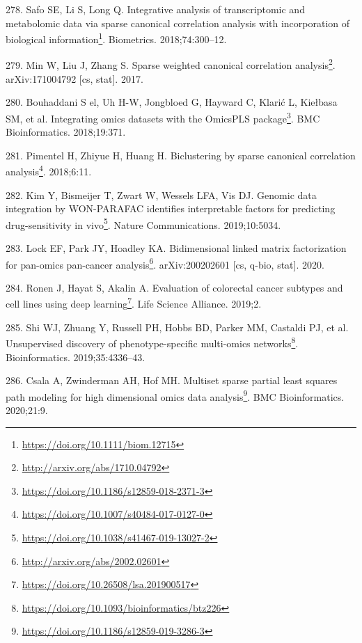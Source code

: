 \documentclass[
  12pt,
  a4paper,
  twoside,
  openright]{book}
\DeclareRobustCommand{\href}[2]{#2\footnote{\url{#1}}}
\newlength{\cslhangindent}
\newlength{\cslentryspacingunit} %
\newenvironment{CSLReferences}[2] %
 {%
  \setlength{\parindent}{0pt}
  \ifodd #1
  \let\oldpar\par
  \def\par{\hangindent=\cslhangindent\oldpar}
  \fi
  \setlength{\parskip}{#2\cslentryspacingunit}
 }%
 {}
\begin{document}
\begin{CSLReferences}{0}{0}
\leavevmode{}%
278. Safo SE, Li S, Long Q. \href{https://doi.org/10.1111/biom.12715}{Integrative analysis of transcriptomic and metabolomic data via sparse canonical correlation analysis with incorporation of biological information}. Biometrics. 2018;74:300--12.

\leavevmode{}%
279. Min W, Liu J, Zhang S. \href{http://arxiv.org/abs/1710.04792}{Sparse weighted canonical correlation analysis}. arXiv:171004792 {[}cs, stat{]}. 2017.

\leavevmode{}%
280. Bouhaddani S el, Uh H-W, Jongbloed G, Hayward C, Klarić L, Kiełbasa SM, et al. \href{https://doi.org/10.1186/s12859-018-2371-3}{Integrating omics datasets with the OmicsPLS package}. BMC Bioinformatics. 2018;19:371.

\leavevmode{}%
281. Pimentel H, Zhiyue H, Huang H. \href{https://doi.org/10.1007/s40484-017-0127-0}{Biclustering by sparse canonical correlation analysis}. 2018;6:11.

\leavevmode{}%
282. Kim Y, Bismeijer T, Zwart W, Wessels LFA, Vis DJ. \href{https://doi.org/10.1038/s41467-019-13027-2}{Genomic data integration by WON-PARAFAC identifies interpretable factors for predicting drug-sensitivity in vivo}. Nature Communications. 2019;10:5034.

\leavevmode{}%
283. Lock EF, Park JY, Hoadley KA. \href{http://arxiv.org/abs/2002.02601}{Bidimensional linked matrix factorization for pan-omics pan-cancer analysis}. arXiv:200202601 {[}cs, q-bio, stat{]}. 2020.

\leavevmode{}%
284. Ronen J, Hayat S, Akalin A. \href{https://doi.org/10.26508/lsa.201900517}{Evaluation of colorectal cancer subtypes and cell lines using deep learning}. Life Science Alliance. 2019;2.

\leavevmode{}%
285. Shi WJ, Zhuang Y, Russell PH, Hobbs BD, Parker MM, Castaldi PJ, et al. \href{https://doi.org/10.1093/bioinformatics/btz226}{Unsupervised discovery of phenotype-specific multi-omics networks}. Bioinformatics. 2019;35:4336--43.

\leavevmode{}%
286. Csala A, Zwinderman AH, Hof MH. \href{https://doi.org/10.1186/s12859-019-3286-3}{Multiset sparse partial least squares path modeling for high dimensional omics data analysis}. BMC Bioinformatics. 2020;21:9.


\end{CSLReferences}
\end{document}
